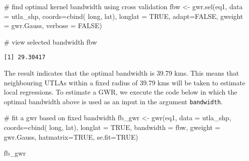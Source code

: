 \documentclass[
  letterpaper,
  krantz2]{style/krantz}
\newenvironment{Shaded}{\begin{snugshade}}{\end{snugshade}}
\newcommand{\AttributeTok}[1]{\textcolor[rgb]{0.40,0.45,0.13}{#1}}
\newcommand{\CommentTok}[1]{\textcolor[rgb]{0.37,0.37,0.37}{#1}}
\newcommand{\ConstantTok}[1]{\textcolor[rgb]{0.56,0.35,0.01}{#1}}
\newcommand{\FunctionTok}[1]{\textcolor[rgb]{0.28,0.35,0.67}{#1}}
\newcommand{\NormalTok}[1]{\textcolor[rgb]{0.00,0.23,0.31}{#1}}
\newcommand{\OtherTok}[1]{\textcolor[rgb]{0.00,0.23,0.31}{#1}}
\begin{document}
\begin{Shaded}
\begin{Highlighting}[]
\CommentTok{\# find optimal kernel bandwidth using cross validation}
\NormalTok{fbw }\OtherTok{\textless{}{-}} \FunctionTok{gwr.sel}\NormalTok{(eq1, }
               \AttributeTok{data =}\NormalTok{ utla\_shp, }
               \AttributeTok{coords=}\FunctionTok{cbind}\NormalTok{( long, lat),}
               \AttributeTok{longlat =} \ConstantTok{TRUE}\NormalTok{,}
               \AttributeTok{adapt=}\ConstantTok{FALSE}\NormalTok{, }
               \AttributeTok{gweight =}\NormalTok{ gwr.Gauss, }
               \AttributeTok{verbose =} \ConstantTok{FALSE}\NormalTok{)}

\CommentTok{\# view selected bandwidth}
\NormalTok{fbw}
\end{Highlighting}
\end{Shaded}

\begin{verbatim}
[1] 29.30417
\end{verbatim}

The result indicates that the optimal bandwidth is 39.79 kms. This means
that neighbouring UTLAs within a fixed radius of 39.79 kms will be taken
to estimate local regressions. To estimate a GWR, we execute the code
below in which the optimal bandwidth above is used as an input in the
argument \texttt{bandwidth}.

\begin{Shaded}
\begin{Highlighting}[]
\CommentTok{\# fit a gwr based on fixed bandwidth}
\NormalTok{fb\_gwr }\OtherTok{\textless{}{-}} \FunctionTok{gwr}\NormalTok{(eq1, }
            \AttributeTok{data =}\NormalTok{ utla\_shp,}
            \AttributeTok{coords=}\FunctionTok{cbind}\NormalTok{( long, lat),}
            \AttributeTok{longlat =} \ConstantTok{TRUE}\NormalTok{,}
            \AttributeTok{bandwidth =}\NormalTok{ fbw, }
            \AttributeTok{gweight =}\NormalTok{ gwr.Gauss,}
            \AttributeTok{hatmatrix=}\ConstantTok{TRUE}\NormalTok{, }
            \AttributeTok{se.fit=}\ConstantTok{TRUE}\NormalTok{)}

\NormalTok{fb\_gwr}
\end{Highlighting}
\end{Shaded}
\end{document}

